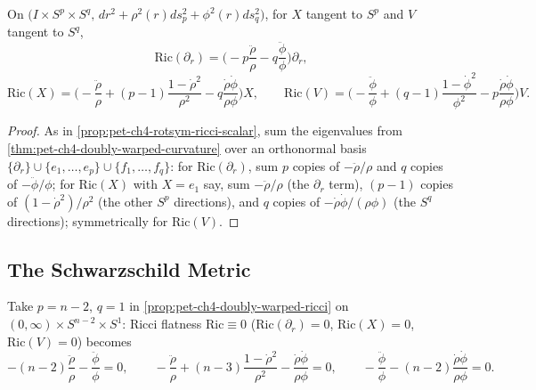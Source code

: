\begin{proposition}
  \label{prop:pet-ch4-doubly-warped-ricci}
  On $\big(I\times S^p\times S^q,\,dr^2+\rho^2(r)ds_p^2+\phi^2(r)ds_q^2\big)$, for
  $X$ tangent to $S^p$ and $V$ tangent to $S^q$,
  \[
    \mathrm{Ric}(\partial_r)=\Big(-p\frac{\ddot\rho}\rho-q\frac{\ddot\phi}\phi\Big)\partial_r,
  \]
  \[
    \mathrm{Ric}(X)=\Big(-\frac{\ddot\rho}\rho+(p-1)\frac{1-\dot\rho^2}{\rho^2}-q\frac{\dot\rho\dot\phi}{\rho\phi}\Big)X,
    \qquad
    \mathrm{Ric}(V)=\Big(-\frac{\ddot\phi}\phi+(q-1)\frac{1-\dot\phi^2}{\phi^2}-p\frac{\dot\rho\dot\phi}{\rho\phi}\Big)V.
  \]
\end{proposition}
\begin{proof}
  As in \cref{prop:pet-ch4-rotsym-ricci-scalar}, sum the eigenvalues from
  \cref{thm:pet-ch4-doubly-warped-curvature} over an orthonormal basis
  $\{\partial_r\}\cup\{e_1,\dots,e_p\}\cup\{f_1,\dots,f_q\}$: for
  $\mathrm{Ric}(\partial_r)$, sum $p$ copies of $-\ddot\rho/\rho$ and $q$ copies of
  $-\ddot\phi/\phi$; for $\mathrm{Ric}(X)$ with $X=e_1$ say, sum $-\ddot\rho/\rho$
  (the $\partial_r$ term), $(p-1)$ copies of $(1-\dot\rho^2)/\rho^2$ (the other
  $S^p$ directions), and $q$ copies of $-\dot\rho\dot\phi/(\rho\phi)$ (the $S^q$
  directions); symmetrically for $\mathrm{Ric}(V)$.
\end{proof}

\subsection{The Schwarzschild Metric}

\begin{definition}
  \label{def:pet-ch4-schwarzschild-construction}
  \leanok
  Take $p=n-2$, $q=1$ in \cref{prop:pet-ch4-doubly-warped-ricci} on
  $(0,\infty)\times S^{n-2}\times S^1$: Ricci flatness $\mathrm{Ric}\equiv0$
  ($\mathrm{Ric}(\partial_r)=0$, $\mathrm{Ric}(X)=0$, $\mathrm{Ric}(V)=0$) becomes
  \[
    -(n-2)\frac{\ddot\rho}\rho-\frac{\ddot\phi}\phi=0,\qquad
    -\frac{\ddot\rho}\rho+(n-3)\frac{1-\dot\rho^2}{\rho^2}-\frac{\dot\rho\dot\phi}{\rho\phi}=0,\qquad
    -\frac{\ddot\phi}\phi-(n-2)\frac{\dot\rho\dot\phi}{\rho\phi}=0.
  \]
\end{definition}


